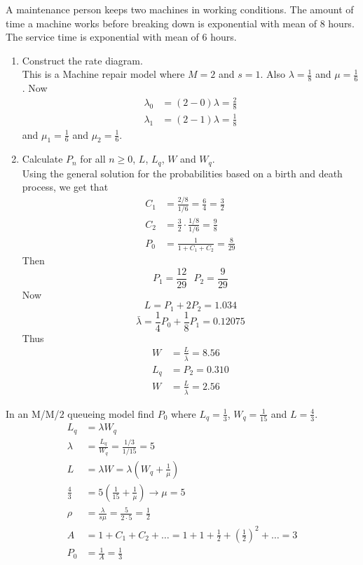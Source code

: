\documentclass[12pt]{article}
\begin{document}
\begin{question} A maintenance person keeps two machines in working conditions. The amount of time a machine works before breaking down is exponential with mean of $8$ hours. The service time is exponential with mean of $6$ hours. 
\begin{enumerate} 
\item Construct the rate diagram. \\
This is a Machine repair model where $M = 2$ and $s= 1$. Also $\lambda = \frac{1}{8}$ and $\mu = \frac{1}{6}$. Now $$ \begin{aligned} \lambda_0 &= (2-0)\lambda = \frac{2}{8} \\ \lambda_1 &= (2-1)\lambda = \frac{1}{8} \end{aligned} $$ and $\mu_1 = \frac{1}{6}$ and $\mu_2 = \frac{1}{6}$.  
\item Calculate $P_n$ for all $n \geq 0$, $L$, $L_q$, $W$ and $W_q$. \\
Using the general solution for the probabilities based on a birth and death process, we get that $$ \begin{aligned} C_1 &= \frac{2/8}{1/6} = \frac{6}{4} = \frac{3}{2} \\ C_2 &= \frac{3}{2} \cdot \frac{1/8}{1/6} = \frac{9}{8} \\ P_0 &= \frac{1}{1 + C_1 + C_2} = \frac{8}{29} \end{aligned} $$ Then $$P_1 = \frac{12}{29} ~~~ P_2 = \frac{9}{29} $$ Now $$ L = P_1 + 2P_2 = 1.034$$ $$ \bar{\lambda} = \frac{1}{4}P_0 + \frac{1}{8}P_1 = 0.12075$$ Thus $$ \begin{aligned} W &= \frac{L}{\bar{\lambda}} = 8.56 \\ L_q &= P_2 = 0.310 \\ W &= \frac{L}{\bar{\lambda}} = 2.56 \end{aligned} $$ 
\end{enumerate} 
\end{question} 

\begin{question} In an M/M/$2$ queueing model find $P_0$ where $L_q = \frac{1}{3}$, $W_q = \frac{1}{15}$ and $L = \frac{4}{3}$. \\
$$ \begin{aligned} L_q &= \lambda W_q \\ \lambda &= \frac{L_q}{W_q} = \frac{1/3}{1/15} = 5 \\ L &= \lambda W = \lambda(W_q + \frac{1}{\mu}) \\ \frac{4}{3} &= 5(\frac{1}{15} + \frac{1}{\mu}) \to \mu = 5 \\ \rho &= \frac{\lambda}{s\mu} = \frac{5}{2 \cdot 5} = \frac{1}{2} \\ A &= 1 + C_1 + C_2 + \dots = 1 + 1 + \frac{1}{2} + (\frac{1}{2})^2 + \dots = 3 \\ P_0 &= \frac{1}{A} = \frac{1}{3} \end{aligned} $$ 
\end{question} 
\end{document}
